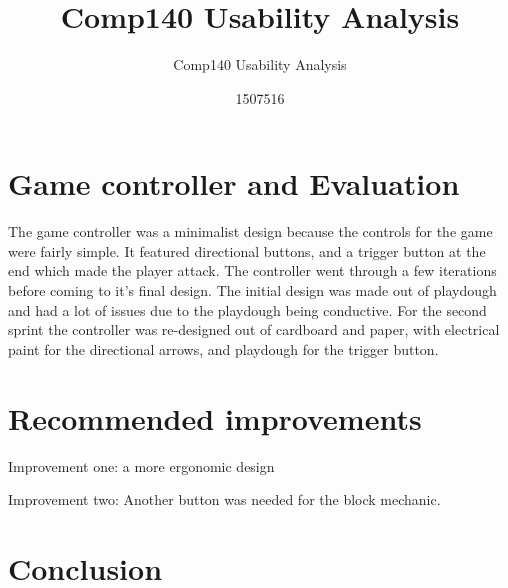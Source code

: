 \documentclass{scrartcl}
\title{Comp140 Usability Analysis}
\subtitle{Comp140 Usability Analysis}
\author{1507516}
\begin{document}
\maketitle

\abstract{}

\section{Game controller and Evaluation}

The game controller was a minimalist design because the controls for the game were fairly simple. It featured directional buttons, and a trigger button at the end which made the player attack. The controller went through a few iterations before coming to it's final design. The initial design was made out of playdough and had a lot of issues due to the playdough being conductive. For the second sprint the controller was re-designed out of cardboard and paper, with electrical paint for the directional arrows, and playdough for the trigger button.

\section{Recommended improvements}

Improvement one:
a more ergonomic design

Improvement two:
Another button was needed for the block mechanic.


\section{Conclusion}



\end{document}
